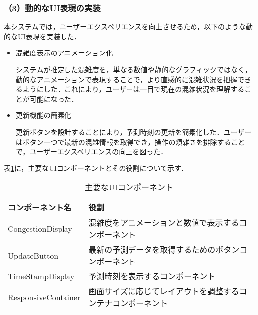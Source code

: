 \subsubsection*{（3）動的なUI表現の実装}
本システムでは，ユーザーエクスペリエンスを向上させるため，以下のような動的なUI表現を実装した．

\begin{itemize}
	\item 混雑度表示のアニメーション化
	
	システムが推定した混雑度を，単なる数値や静的なグラフィックではなく，動的なアニメーションで表現することで，より直感的に混雑状況を把握できるようにした．これにより，ユーザーは一目で現在の混雑状況を理解することが可能になった．
	
	\item 更新機能の簡素化
	
	更新ボタンを設計することにより，予測時刻の更新を簡素化した．ユーザーはボタン一つで最新の混雑情報を取得でき，操作の煩雑さを排除することで，ユーザーエクスペリエンスの向上を図った．
	
\end{itemize}

表\ref{tbl:UI_components}に，主要なUIコンポーネントとその役割について示す．

\begin{table}[tb]
	\centering
	\caption{主要なUIコンポーネント}
	\label{tbl:UI_components}
	\small
	\doublerulesep=0.3pt
	\begin{tabular}{l|p{9cm}} \hline\hline\hline
		コンポーネント名 & 役割 \\ \hline
		CongestionDisplay & 混雑度をアニメーションと数値で表示するコンポーネント \\ \hline
		UpdateButton & 最新の予測データを取得するためのボタンコンポーネント \\ \hline
		TimeStampDisplay & 予測時刻を表示するコンポーネント \\ \hline
		ResponsiveContainer & 画面サイズに応じてレイアウトを調整するコンテナコンポーネント \\ \hline\hline\hline
	\end{tabular}
\end{table}